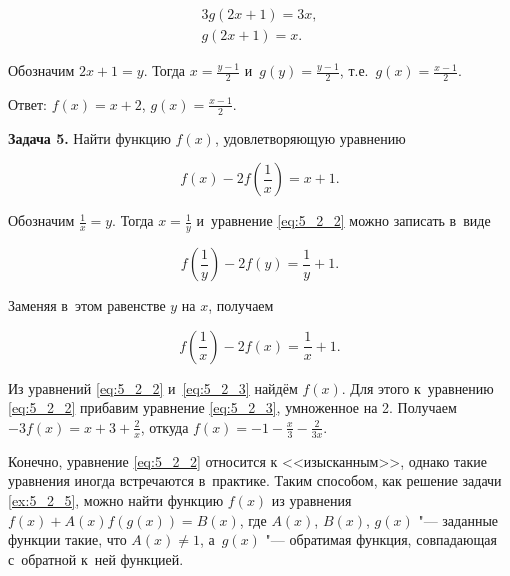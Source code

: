 \begin{gather*}
3g(2x + 1) = 3x, \\
g(2x + 1) = x.
\end{gather*}

Обозначим $2x + 1 = y$. Тогда $\displaystyle x = \frac{y -1}{2}$
и~$\displaystyle g(y) = \frac{y - 1}{2}$,
т.е.\ $\displaystyle g(x) = \frac{x-1}{2}$.

Ответ: $f(x) = x + 2$, $\displaystyle g(x) = \frac{x - 1}{2}$.

\textbf{Задача 5.}\label{ex:5_2_5} Найти функцию $f(x)$, удовлетворяющую уравнению

\begin{equation}\label{eq:5_2_2}
\displaystyle f(x) - 2f \left( \frac{1}{x} \right) = x + 1.
\end{equation}

Обозначим $\displaystyle \frac{1}{x} = y$. Тогда $\displaystyle x = \frac{1}{y}$
и~уравнение \eqref{eq:5_2_2} можно записать в~виде

\begin{equation*}
\displaystyle f \left( \frac{1}{y} \right) - 2f(y) = \frac{1}{y} + 1.
\end{equation*}

Заменяя в~этом равенстве $y$ на $x$, получаем

\begin{equation}\label{eq:5_2_3}
\displaystyle f \left( \frac{1}{x} \right) - 2f(x) = \frac{1}{x} + 1.
\end{equation}

Из уравнений \eqref{eq:5_2_2} и~\eqref{eq:5_2_3} найдём $f(x)$.
Для этого к~уравнению \eqref{eq:5_2_2} прибавим уравнение \eqref{eq:5_2_3},
умноженное на 2. Получаем $\displaystyle -3f(x) = x + 3 + \frac{2}{x}$,
откуда $\displaystyle f(x) = -1 - \frac{x}{3} - \frac{2}{3x}$.

Конечно, уравнение \eqref{eq:5_2_2} относится к <<изысканным>>, однако
такие уравнения иногда встречаются в~практике.
Таким способом, как решение задачи \ref{ex:5_2_5}, можно найти функцию $f(x)$
из уравнения $f(x) + A(x) f(g(x)) = B(x)$, где $A(x)$, $B(x)$, $g(x)$ "--- заданные
функции такие, что $A(x) \ne 1$, а~$g(x)$ "--- обратимая функция,
совпадающая с~обратной к~ней функцией.
